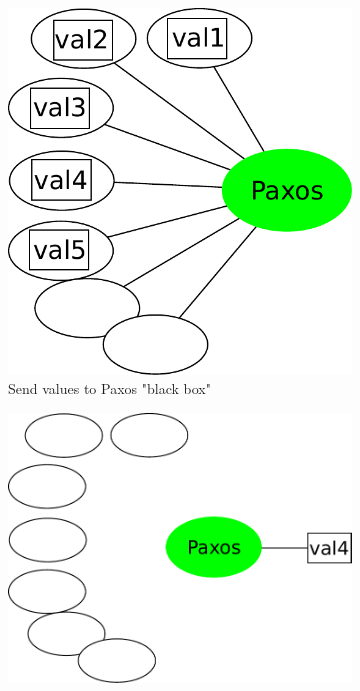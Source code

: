 \documentclass[english,11pt]{l4proj}
\begin{document}
\begin{figure}
    \begin{subfigure}[b]{0.2\textwidth}
        \includegraphics[width=\textwidth]{images/paxos1.pdf}
        \caption{Send values to Paxos "black box"}
    \end{subfigure}\hfill
    \begin{subfigure}[b]{0.3\textwidth}
        \includegraphics[width=\textwidth]{images/paxos2.pdf}

\end{subfigure}
\end{figure}
\end{document}

